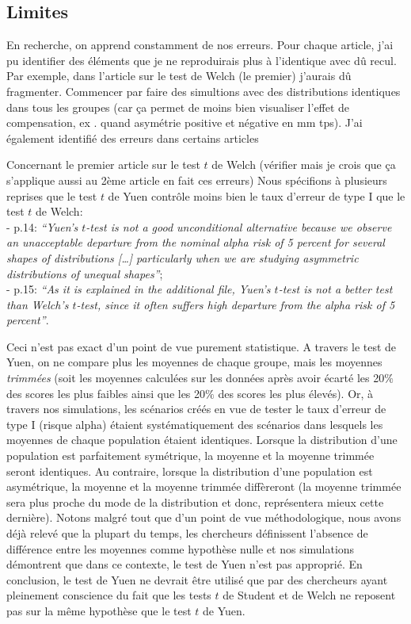 \documentclass[
  12pt,
  french,
]{article}
\begin{document}
\hypertarget{limites}{%
\subsection{Limites}\label{limites}}

En recherche, on apprend constamment de nos erreurs. Pour chaque
article, j'ai pu identifier des éléments que je ne reproduirais plus à
l'identique avec dû recul. Par exemple, dans l'article sur le test de
Welch (le premier) j'aurais dû fragmenter. Commencer par faire des
simultions avec des distributions identiques dans tous les groupes (car
ça permet de moins bien visualiser l'effet de compensation, ex . quand
asymétrie positive et négative en mm tps). J'ai également identifié des
erreurs dans certains articles

Concernant le premier article sur le test \(t\) de Welch (vérifier mais
je crois que ça s'applique aussi au 2ème article en fait ces erreurs)
Nous spécifions à plusieurs reprises que le test \(t\) de Yuen contrôle
moins bien le taux d'erreur de type I que le test \(t\) de Welch:\\
- p.14: \emph{``Yuen's \(t\)-test is not a good unconditional
alternative because we observe an unacceptable departure from the
nominal alpha risk of 5 percent for several shapes of distributions
{[}\ldots{]} particularly when we are studying asymmetric distributions
of unequal shapes''};\\
- p.15: \emph{``As it is explained in the additional file, Yuen's
\(t\)-test is not a better test than Welch's \(t\)-test, since it often
suffers high departure from the alpha risk of 5 percent''}.

Ceci n'est pas exact d'un point de vue purement statistique. A travers
le test de Yuen, on ne compare plus les moyennes de chaque groupe, mais
les moyennes \emph{trimmées} (soit les moyennes calculées sur les
données après avoir écarté les 20\(\%\) des scores les plus faibles
ainsi que les 20\(\%\) des scores les plus élevés). Or, à travers nos
simulations, les scénarios créés en vue de tester le taux d'erreur de
type I (risque alpha) étaient systématiquement des scénarios dans
lesquels les moyennes de chaque population étaient identiques. Lorsque
la distribution d'une population est parfaitement symétrique, la moyenne
et la moyenne trimmée seront identiques. Au contraire, lorsque la
distribution d'une population est asymétrique, la moyenne et la moyenne
trimmée diffèreront (la moyenne trimmée sera plus proche du mode de la
distribution et donc, représentera mieux cette dernière). Notons malgré
tout que d'un point de vue méthodologique, nous avons déjà relevé que la
plupart du temps, les chercheurs définissent l'absence de différence
entre les moyennes comme hypothèse nulle et nos simulations démontrent
que dans ce contexte, le test de Yuen n'est pas approprié. En
conclusion, le test de Yuen ne devrait être utilisé que par des
chercheurs ayant pleinement conscience du fait que les tests \(t\) de
Student et de Welch ne reposent pas sur la même hypothèse que le test
\(t\) de Yuen.
\end{document}
